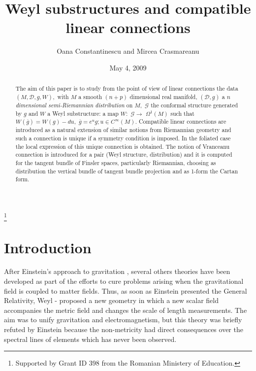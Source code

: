 \documentclass[11pt,oneside,english]{amsart}
\numberwithin{equation}{section}
\numberwithin{figure}{section}
\theoremstyle{plain}
\theoremstyle{definition}
\theoremstyle{definition}
\theoremstyle{plain}
\theoremstyle{plain}
\theoremstyle{remark}
\theoremstyle{remark}
\begin{document}
\title{Weyl substructures and compatible linear connections}

\author{Oana Constantinescu and Mircea Crasmareanu}

\begin{abstract}
The aim of this paper is to study from the point of view of linear
connections the data $\left(M,\mathcal{D},g,W\right),$ with $M$
a smooth $\left(n+p\right)$ di\-men\-sio\-nal real manifold, $\left(\mathcal{D},g\right)$
a \textit{$n$ }\textit{\emph{dimensional semi-Riemannian distribution}}\emph{
}on $M,$ $\mathcal{G}$ the conformal structure generated by $g$
and $W$ a Weyl substructure: a map $W:$ $\mathcal{G}\rightarrow$
$\Omega^{1}\left(M\right)$ such that $W\left(\overline{g}\right)=W\left(g\right)-du,$
$\overline{g}=e^{u}g;u\in C^{\infty}\left(M\right).$ Compatible linear
connections are introduced as a natural extension of similar notions
from Riemannian geo\-me\-try and such a connection is unique if
a symmetry condition is imposed. In the foliated case the local expression
of this unique connection is obtained. The notion of Vranceanu connection
is introduced for a pair (Weyl structure, distribution) and it is
computed for the tangent bundle of Finsler spaces, particularly Riemannian,
choo\-sing as distribution the vertical bundle of tangent bundle
projection and as 1-form the Cartan form. 
\end{abstract}



\thanks{Supported by  Grant ID 398 from the Romanian Ministery of Education. }

\date{May 4, 2009}

\maketitle

\section*{Introduction}

After Einstein's approach to gravitation \cite{Einstein}, several
others theories have been developed as part of the efforts to cure
problems arising when the gravitational field is coupled to matter
fields. Thus, as soon as Einstein presented the General Relativity,
Weyl \cite{Weyl}-\cite{w:h} proposed a new geometry in which a new
scalar field accompanies the metric field and changes the scale of
length measurements. The aim was to unify gravitation and electromagnetism,
but this theory was briefly refuted by Einstein because the non-metricity
had direct consequences over the spectral lines of elements which
has never been observed.
\end{document}
